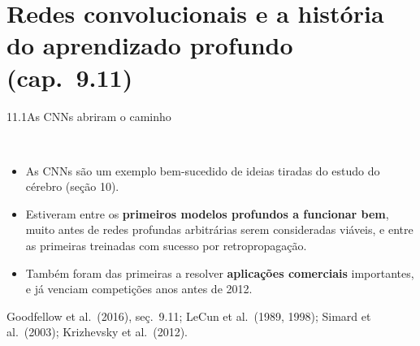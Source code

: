 \documentclass[aspectratio=169,11pt]{beamer}
\begin{document}
\section[11.\enspace Redes convolucionais e a história do aprendizado profundo (cap.~9.11)]{Redes convolucionais e a história do aprendizado profundo \textcolor{cinza}{(cap.~9.11)}}

\begin{frame}{11.1\enspace As CNNs abriram o caminho}
  \centering
  \\[0.8em]
  \raggedright
  \small
  \begin{itemize}
    \item As CNNs são um exemplo bem-sucedido de ideias tiradas do estudo do cérebro (seção 10).
    \item Estiveram entre os \textbf{primeiros modelos profundos a funcionar bem}, muito antes de redes profundas arbitrárias serem
      consideradas viáveis, e entre as primeiras treinadas com sucesso por retropropagação.
    \item Também foram das primeiras a resolver \textbf{aplicações comerciais} importantes, e já venciam competições anos antes de 2012.
  \end{itemize}
  {\scriptsize\textcolor{cinza}{Goodfellow et al.\ (2016), seç.~9.11; LeCun et al.\ (1989, 1998); Simard et al.\ (2003); Krizhevsky et al.\ (2012).}}
\end{frame}
\end{document}
